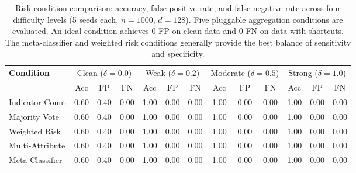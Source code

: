 \begin{table}[ht]
\centering
\scriptsize
\caption{Risk condition comparison: accuracy, false positive rate, and false negative rate across four difficulty levels (5 seeds each, $n{=}1000$, $d{=}128$). Five pluggable aggregation conditions are evaluated. An ideal condition achieves 0 FP on clean data and 0 FN on data with shortcuts. The meta-classifier and weighted risk conditions generally provide the best balance of sensitivity and specificity.}
\label{tab:risk_conditions}
\begin{tabular}{l|ccc|ccc|ccc|ccc}
\hline
\textbf{Condition} & \multicolumn{3}{c|}{Clean ($\delta{=}0.0$)} & \multicolumn{3}{c|}{Weak ($\delta{=}0.2$)} & \multicolumn{3}{c|}{Moderate ($\delta{=}0.5$)} & \multicolumn{3}{c}{Strong ($\delta{=}1.0$)} \\
  & Acc & FP & FN & Acc & FP & FN & Acc & FP & FN & Acc & FP & FN \\
\hline
Indicator Count & 0.60 & 0.40 & 0.00 & 1.00 & 0.00 & 0.00 & 1.00 & 0.00 & 0.00 & 1.00 & 0.00 & 0.00 \\
Majority Vote & 0.60 & 0.40 & 0.00 & 1.00 & 0.00 & 0.00 & 1.00 & 0.00 & 0.00 & 1.00 & 0.00 & 0.00 \\
Weighted Risk & 0.60 & 0.40 & 0.00 & 1.00 & 0.00 & 0.00 & 1.00 & 0.00 & 0.00 & 1.00 & 0.00 & 0.00 \\
Multi-Attribute & 0.60 & 0.40 & 0.00 & 1.00 & 0.00 & 0.00 & 1.00 & 0.00 & 0.00 & 1.00 & 0.00 & 0.00 \\
Meta-Classifier & 0.60 & 0.40 & 0.00 & 1.00 & 0.00 & 0.00 & 1.00 & 0.00 & 0.00 & 1.00 & 0.00 & 0.00 \\
\hline
\end{tabular}
\end{table}